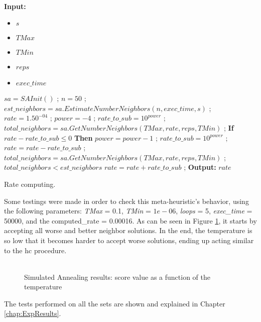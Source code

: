 \\
\begin{algorithm}[t!]
\textbf{Input:} 
\begin{itemize}
	\setlength{\itemsep}{1pt}
	\item $s$ 
	\item $TMax$ 
	\item $TMin$ 
	\item $reps$ 
	\item $exec\_time$ 
\end{itemize}
\begin{algorithmic}
\State $sa = SAInit()$ ;
\State $n = 50$ ; 
\State $est\_neighbors = sa.EstimateNumberNeighbors(n, exec\_time, s)$ ;
\State $rate = 1.50^{-04}$ ;
\State $power = -4$ ;
\State $rate\_to\_sub = 10^{power}$ ;
\State $total\_neighbors = sa.GetNumberNeighbors(TMax, rate, reps, TMin)$ ;
\Repeat	
	\State \textbf{If} $rate - rate\_to\_sub \leq 0$ \textbf{Then} $power = power - 1$ ; $rate\_to\_sub = 10^{power}$ ;
	\State $rate = rate - rate\_to\_sub$ ;
	\State $total\_neighbors = sa.GetNumberNeighbors(TMax, rate, reps, TMin)$ ;
\Until $total\_neighbors < est\_neighbors$
\State $rate = rate + rate\_to\_sub$ ; 
\State \textbf{Output:} $rate$ 
\end{algorithmic}
\caption{Rate computing.}
\label{alg:RateComputing}
\end{algorithm}Some testings were made in order to check this meta-heuristic's behavior, using the following parameters: \textit{TMax} = 0.1, \textit{TMin} = $1e-06$, \textit{loops} = 5, \textit{exec\_time} = 50000, and the computed\_rate = 0.00016. As can be seen in Figure \ref{fig:SimulatedAnnealingPlot}, it starts by accepting all worse and better neighbor solutions. In the end, the temperature is so low that it becomes harder to accept worse solutions, ending up acting similar to the \gls{hc} procedure.\\
\\
\begin{figure}[!t]
\centering


\caption{Simulated Annealing results: score value as a function of the temperature} 
\label{fig:SimulatedAnnealingPlot}
\end{figure}
The tests performed on all the sets are shown and explained in Chapter \ref{chap:ExpResults}.

